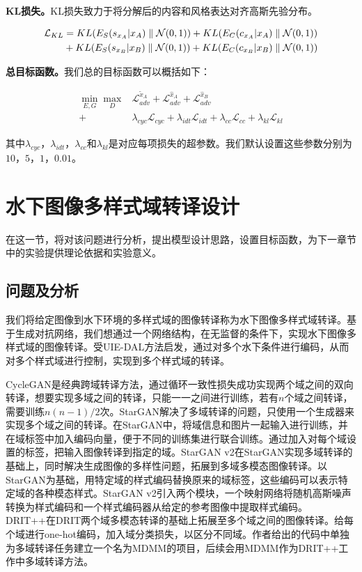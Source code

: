 \textbf{KL损失。}KL损失致力于将分解后的内容和风格表达对齐高斯先验分布。

\begin{equation}
\begin{split}
\mathcal{L}_{KL}& = \mathnormal{KL}(E_S(s_{x_A}|x_A)\parallel \mathcal{N}(0,1)) + \mathnormal{KL}(E_C(c_{x_A}|x_A)\parallel \mathcal{N}(0,1)) \\
 & + \mathnormal{KL}(E_S(s_{x_B}|x_B)\parallel \mathcal{N}(0,1)) + \mathnormal{KL}(E_C(c_{x_B}|x_B)\parallel \mathcal{N}(0,1))
\end{split}
\label{eq:KL}
\end{equation}

\textbf{总目标函数。}我们总的目标函数可以概括如下：

\begin{equation}
\label{equ:full}
\begin{aligned}
\min_{E,G}\max_{D} & \mathcal{L}_{adv}^{\tilde{x}_A}+\mathcal{L}_{adv}^{\hat{x}_A}+\mathcal{L}_{adv}^{\hat{x}_B} \\
+&\lambda_{cyc}\mathcal{L}_{cyc}+\lambda_{idt}\mathcal{L}_{idt}+\lambda_{cc}\mathcal{L}_{cc}+\lambda_{kl}\mathcal{L}_{kl}
\end{aligned}
\end{equation}

其中$\lambda_{cyc}$，$\lambda_{idt}$，$\lambda_{cc}$和$\lambda_{kl}$是对应每项损失的超参数。我们默认设置这些参数分别为$10$，$5$，$1$，$0.01$。

\section{水下图像多样式域转译设计}
在这一节，将对该问题进行分析，提出模型设计思路，设置目标函数，为下一章节中的实验提供理论依据和实验意义。

\subsection{问题及分析}
我们将给定图像到水下环境的多样式域的图像转译称为水下图像多样式域转译。基于生成对抗网络，我们想通过一个网络结构，在无监督的条件下，实现水下图像多样式域的图像转译。受UIE-DAL方法启发，通过对多个水下条件进行编码，从而对多个样式域进行控制，实现到多个样式域的转译。

CycleGAN是经典跨域转译方法，通过循环一致性损失成功实现两个域之间的双向转译，想要实现多域之间的转译，只能一一之间进行训练，若有$n$个域之间转译，需要训练$n(n-1)/2$次。StarGAN解决了多域转译的问题，只使用一个生成器来实现多个域之间的转译。在StarGAN中，将域信息和图片一起输入进行训练，并在域标签中加入编码向量，便于不同的训练集进行联合训练。通过加入对每个域设置的标签，把输入图像转译到指定的域。StarGAN v2在StarGAN实现多域转译的基础上，同时解决生成图像的多样性问题，拓展到多域多模态图像转译。以StarGAN为基础，用特定域的样式编码替换原来的域标签，这些编码可以表示特定域的各种模态样式。StarGAN v2引入两个模块，一个映射网络将随机高斯噪声转换为样式编码和一个样式编码器从给定的参考图像中提取样式编码。DRIT++在DRIT两个域多模态转译的基础上拓展至多个域之间的图像转译。给每个域进行one-hot编码，加入域分类损失，以区分不同域。作者给出的代码中单独为多域转译任务建立一个名为MDMM的项目，后续会用MDMM作为DRIT++工作中多域转译方法。

